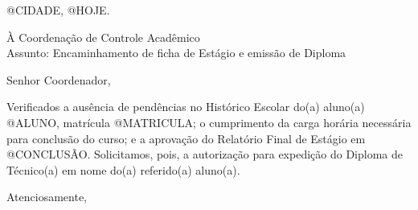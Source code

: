 


\hspace{1.4cm}

{\bf
\begin{flushright} @CIDADE, @HOJE. \end{flushright}

\noindent À Coordenação de Controle Acadêmico\\
Assunto: Encaminhamento de ficha de Estágio e emissão de Diploma

\noindent Senhor Coordenador,

\onehalfspacing Verificados a ausência de pendências no Histórico Escolar do(a) aluno(a)\linebreak
@ALUNO, matrícula @MATRICULA; o cumprimento da carga horária necessária para conclusão do curso; e a aprovação do Relatório Final de Estágio  em @CONCLUSÃO. Solicitamos, pois, a autorização para expedição do Diploma de Técnico(a) em nome do(a) referido(a) aluno(a).

Atenciosamente,
}



\noindent{}

